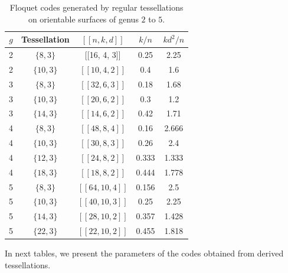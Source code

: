 \documentclass[%
reprint,
amsmath,amssymb,
aps,
]{revtex4-2}
\begin{document}
\begin{table}[b]
	\caption{\label{tab:tess2}
		Floquet codes generated by regular tessellations on orientable surfaces of genus $2$ to $5$.}
	\begin{ruledtabular}
		\begin{tabular}{|c|c|c|c|c|}
			$g$ & Tessellation & $[[n,k,d]]$ & $k/n$ & $kd^{2}/n$ \\
			\hline
			2 & $\{8,3\}$ & [[16,	4,	3]] & 	0.25 &	2.25 \\
			2 & $\{10,3\}$    & $[[10, 4, 2]]$  & 0.4	& 1.6	 \\
			3 & $\{8,3\}$     & $[[32, 6, 3]]$  & 0.18	& 1.68  \\
			3 & $\{10,3\}$    & $[[20, 6, 2]]$  & 0.3 &	1.2  \\
			3 & $\{14,3\}$    & $[[14, 6, 2]]$  & 0.42	& 1.71	 \\
			4 & $\{8,3\}$     & $[[48, 8, 4]]$  & 0.16	& 2.666	\\
			4 & $\{10,3\}$    & $[[30, 8, 3]]$  & 0.26	& 2.4 \\
			4 & $\{12,3\}$    & $[[24, 8, 2]]$  & 0.333	& 1.333  \\
			4 & $\{18,3\}$    & $[[18, 8, 2]]$  & 0.444	& 1.778	\\
			5 & $\{8,3\}$     & $[[64, 10, 4]]$ & 0.156	& 2.5  \\
			5 & $\{10,3\}$    & $[[40, 10, 3]]$ & 0.25	& 2.25 \\
			5 & $\{14,3\}$    & $[[28, 10, 2]]$ & 0.357	& 1.428 \\
			5 & $\{22,3\}$    & $[[22, 10, 2]]$ & 0.455	& 1.818	\\
			\end{tabular}
	\end{ruledtabular}
\end{table}


In next tables, we present the parameters of the codes obtained from derived tessellations.
\end{document}
